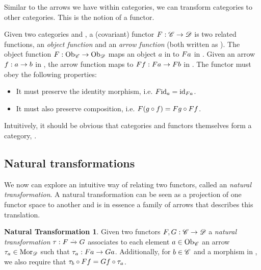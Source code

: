 Similar to the arrows we have within categories, we can transform categories to other categories. This is the notion of a functor.
\begin{covfunctordef}
  Given two categories  and , a (covariant) functor $\mathnormal{F}:
  \mathscr{C} \to \mathscr{D}$ is two related functions, an \emph{object function} and
  an \emph{arrow function} (both written as ). The object function
  $\mathnormal{F}: \mathrm{Ob}_{\mathscr{C}} \to \mathrm{Ob}_{\mathscr{D}}$ maps an object $a$ in  to
  $\mathnormal{F} \mathnormal{a}$ in . Given an arrow $\mathnormal{f}: \mathnormal{a} \to
  \mathnormal{b}$ in , the arrow function maps  to
  $\mathnormal{F} \mathnormal{f}: \mathnormal{F} \mathnormal{a} \to \mathnormal{F} \mathnormal{b}$ in . The functor must obey the following properties:
  \begin{itemize}
    \item It must preserve the identity morphism, i.e. $\mathnormal{F} \mathnormal{\mathrm{id}_{\mathnormal{a}}} = \mathrm{id}_{\mathnormal{\mathnormal{F} \mathnormal{a}}}$.
    \item It must also preserve composition, i.e. $\mathnormal{F} \mathnormal{\left(\mathnormal{g} \circ \mathnormal{f}\right)} = \mathnormal{F} \mathnormal{\mathnormal{g}} \circ \mathnormal{F} \mathnormal{\mathnormal{f}}$.
  \end{itemize}
\end{covfunctordef}

Intuitively, it should be obvious that categories and functors themselves form a category, .\\

\subsection{Natural transformations}
\theoremstyle{definition}\newtheorem*{nattransdef}{Natural Transformation}
We now can explore an intuitive way of relating two functors, called an \emph{natural transformation}. A natural transformation can be seen as a projection of one functor space to another and is in essence a family of arrows that describes this translation.
\begin{nattransdef}
Given two functors $\mathnormal{F}, \mathnormal{G} : \mathscr{C} \to \mathscr{D}$ a
\emph{natural transformation} $\tau: \mathnormal{F} \xrightarrow{.} \mathnormal{G}$ associates to each element $\mathnormal{a} \in \mathrm{Ob}_{\mathscr{C}}$ an arrow $\tau_{a} \in \mathrm{Mor}_{\mathscr{D}}$ such that $\tau_{a}: \mathnormal{F} \mathnormal{a} \to \mathnormal{G} \mathnormal{a}$. Additionally, for $\mathnormal{b} \in \mathscr{C}$ and  a morphism in , we also require that $\tau_{b} \circ \mathnormal{F} \mathnormal{f} = \mathnormal{G} \mathnormal{f} \circ \tau_{a}$.

\end{nattransdef}

